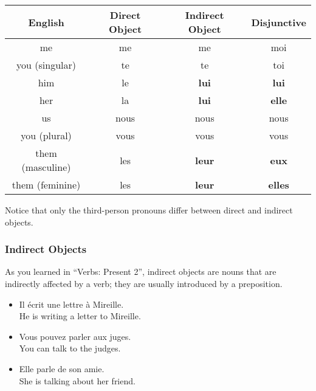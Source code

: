\begin{center}\begin{tabular}{|c|c|c|c|}
\hline
\textbf{English} & \textbf{Direct Object} & \textbf{Indirect Object} & \textbf{Disjunctive} \\ \hline
me               & me                     & me                       & moi                  \\ \hline
you (singular)   & te                     & te                       & toi                  \\ \hline
him              & le                     & \textbf{lui}             & \textbf{lui}         \\ \hline
her              & la                     & \textbf{lui}             & \textbf{elle}        \\ \hline
us               & nous                   & nous                     & nous                 \\ \hline
you (plural)     & vous                   & vous                     & vous                 \\ \hline
them (masculine) & les                    & \textbf{leur}            & \textbf{eux}         \\ \hline
them (feminine)  & les                    & \textbf{leur}            & \textbf{elles}       \\ \hline
\end{tabular}\end{center}

Notice that only the third-person pronouns differ between direct and indirect objects.

\subsubsection{Indirect Objects}

As you learned in ``Verbs: Present 2'', indirect objects are nouns that are indirectly affected by a verb; they are usually introduced by a preposition.

\begin{itemize}
  \item  Il {\'e}crit une lettre {\`a} Mireille. \\ He is writing a letter to Mireille.
	\item  Vous pouvez parler aux juges. \\ You can talk to the judges.
	\item  Elle parle de son amie. \\ She is talking about her friend.
\end{itemize}

